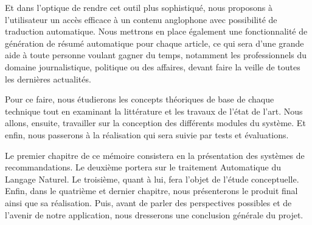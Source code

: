 Et dans l'optique de rendre cet outil plus sophistiqué, nous proposons à l'utilisateur un accès efficace à un contenu anglophone avec possibilité de traduction automatique. Nous mettrons en place également une fonctionnalité de génération de résumé automatique pour chaque article, ce qui sera d'une grande aide à toute personne voulant gagner du temps, notamment les professionnels du domaine journalistique, politique ou des affaires, devant faire la veille de toutes les dernières actualités.

Pour ce faire, nous étudierons les concepts théoriques de base de chaque technique tout en examinant la littérature et les travaux de l'état de l'art. Nous allons, ensuite, travailler sur la conception des différents modules du système. Et enfin, nous passerons à la réalisation qui sera suivie par tests et évaluations.

Le premier chapitre de ce mémoire consistera en la présentation des systèmes de recommandations. Le deuxième portera sur le traitement Automatique du Langage Naturel. Le troisième, quant à lui, fera l'objet de l'étude conceptuelle. Enfin, dans le quatrième et dernier chapitre, nous présenterons le produit final ainsi que sa réalisation. Puis, avant de parler des perspectives possibles et de l'avenir de notre application, nous dresserons une conclusion générale du projet.

